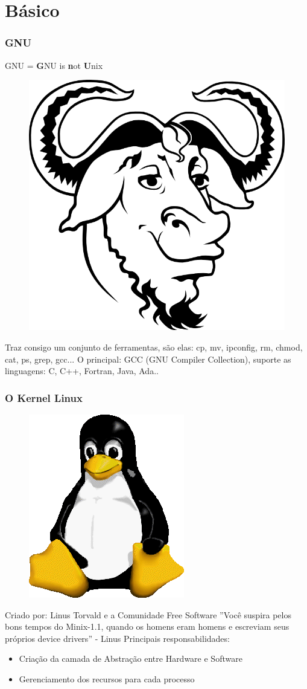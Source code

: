 \documentclass{beamer}
\begin{document}
\section{Básico}

\begin{frame}
    \frametitle{GNU}
    \centerline{GNU = \textbf{G}NU is \textbf{n}ot \textbf{U}nix}

    \begin{figure}
        \includegraphics[width=.2\linewidth]{gnulogo.png}
    \end{figure}

    Traz consigo um conjunto de ferramentas, são elas: cp, mv, ipconfig, rm, chmod, cat, ps, grep, gcc...
    \newline
    \newline
    O principal: GCC (GNU Compiler Collection), suporte as linguagens: C, C++, Fortran, Java, Ada..
\end{frame}

\begin{frame}
    \frametitle{O Kernel Linux}
    
    \begin{figure}
        \includegraphics[width=.1\linewidth]{logo.png}
    \end{figure}


    Criado por: Linus Torvald e a Comunidade Free Software
    \newline
    \newline
    ''Você suspira pelos bons tempos do Minix-1.1, quando os homens eram homens e escreviam seus próprios device drivers'' - Linus
        Principais responsabilidades:
    \begin{itemize}
        \item Criação da camada de Abstração entre Hardware e Software
        \item Gerenciamento dos recursos para cada processo
    \end{itemize}
\end{frame}
\end{document}
